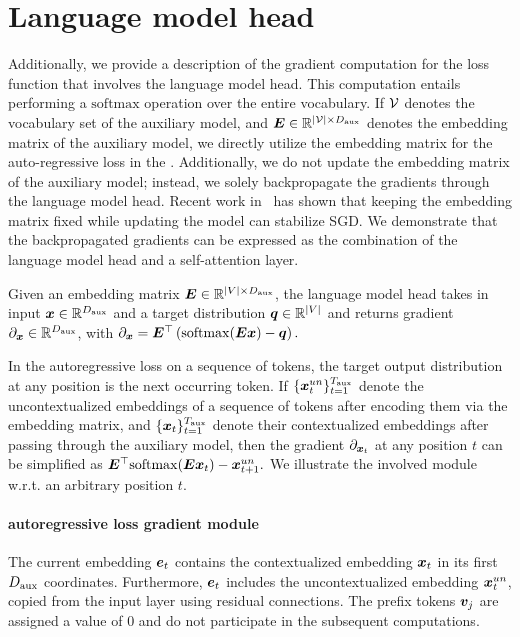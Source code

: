 \section{Language model head} \label{sec:lm_head}
Additionally, we provide a description of the gradient computation for the loss function that involves the language model head. This computation entails performing a $\mathrm{softmax}$ operation over the entire vocabulary. If $\mathcal{V}$ denotes the vocabulary set of the auxiliary model, and ${\bm{E}} \in \mathbb{R}^{\left| \mathcal{V} \right| \times D_{\text{aux}}}$ denotes the embedding matrix of the auxiliary model, we directly utilize the  embedding matrix for the auto-regressive loss in the \simulator. Additionally, we do not update the embedding matrix of the auxiliary model; instead, we solely backpropagate the gradients through the language model head. Recent work in~\citep{kumar2022finetune} has shown that keeping the embedding matrix fixed while updating the model can stabilize SGD. 
We demonstrate that the backpropagated gradients can be expressed as the combination of the language model head and a self-attention layer.



\begin{definition} \label{def:auxiliary_lm_back}
Given an embedding matrix ${\bm{E}} \in \mathbb{R}^{\left| V \right| \times D_{\text{aux}}}$, the language model head takes in input ${\bm{x}} \in \mathbb{R}^{D_{\text{aux}}}$ and a target distribution ${\bm{q}} \in \mathbb{R}^{\left| V \right|}$ and returns gradient $\partial_{{\bm{x}}} \in \mathbb{R}^{D_{\text{aux}}}$, with $\partial_{{\bm{x}}} = {\bm{E}}^{\top} \left( \mathrm{softmax} ( {\bm{E}} {\bm{x}} ) - {\bm{q}} \right).$ 
\end{definition}


In the autoregressive loss on a sequence of tokens, the target output distribution at any position is the next occurring token. If  $\{{\bm{x}}^{un}_t\}_{t=1}^{T_{\text{aux}}}$ denote the uncontextualized embeddings of a sequence of tokens after encoding them via the embedding matrix, and 
$\{{\bm{x}}_t\}_{t=1}^{T_{\text{aux}}}$ denote their contextualized embeddings after passing through the auxiliary model, then the gradient $\partial_{{\bm{x}}_t}$ at any position $t$ can be simplified as ${\bm{E}}^{\top}  \mathrm{softmax} ( {\bm{E}} {\bm{x}}_t ) - {\bm{x}}^{un}_{t+1}.$ We illustrate the involved \simulator{} module w.r.t. an arbitrary position $t$.


\paragraph{\simulator{} autoregressive loss gradient module} 
The current embedding $\ve_t$ contains the contextualized embedding ${\bm{x}}_t$ in its first $D_{\text{aux}}$ coordinates. Furthermore, $\ve_t$ includes the uncontextualized embedding ${\bm{x}}^{un}_t$, copied from the input layer using residual connections. The prefix tokens ${ {\bm{v}}_j }$ are assigned a value of $0$ and do not participate in the subsequent computations.

